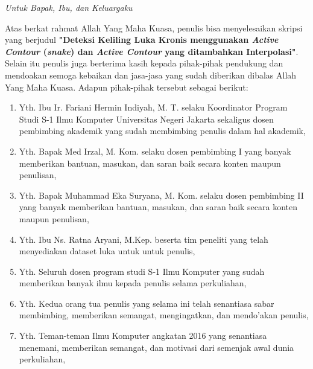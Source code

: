 \documentclass{jtetiskripsi}
\begin{document}
\cover
%
%




\acknowledgment
\begin{flushright}
	\emph{Untuk Bapak, Ibu, dan Keluargaku}
\end{flushright}


\preface
\pagestyle{chapterheading}
Atas berkat rahmat Allah Yang Maha Kuasa, penulis bisa menyelesaikan skripsi yang berjudul \textbf{"Deteksi Keliling Luka Kronis menggunakan \emph{Active Contour} (\emph{snake}) dan \emph{Active Contour} yang ditambahkan Interpolasi"}. Selain itu penulis juga berterima kasih kepada pihak-pihak pendukung dan mendoakan semoga kebaikan dan jasa-jasa yang sudah diberikan dibalas Allah Yang Maha Kuasa. Adapun pihak-pihak tersebut sebagai berikut:

\begin{enumerate}
	\item Yth. Ibu Ir. Fariani Hermin Indiyah, M. T. selaku Koordinator Program Studi S-1 Ilmu Komputer Universitas Negeri Jakarta sekaligus dosen pembimbing akademik yang sudah membimbing penulis dalam hal akademik,
	\item Yth. Bapak Med Irzal, M. Kom. selaku dosen pembimbing I yang banyak memberikan bantuan, masukan, dan saran baik secara konten maupun penulisan,
	\item Yth. Bapak Muhammad Eka Suryana, M. Kom. selaku dosen pembimbing II yang banyak memberikan bantuan, masukan, dan saran baik secara konten maupun penulisan,
	\item Yth. Ibu Ns. Ratna Aryani, M.Kep. beserta tim peneliti yang telah menyediakan dataset luka untuk untuk penulis,
	\item Yth. Seluruh dosen program studi S-1 Ilmu Komputer yang sudah memberikan banyak ilmu kepada penulis selama perkuliahan,
	\item Yth. Kedua orang tua penulis yang selama ini telah senantiasa sabar membimbing, memberikan semangat, mengingatkan, dan mendo’akan penulis,
	\item Yth. Teman-teman Ilmu Komputer angkatan 2016 yang senantiasa menemani, memberikan semangat, dan motivasi dari semenjak awal dunia perkuliahan,
\end{enumerate}
\end{document}
